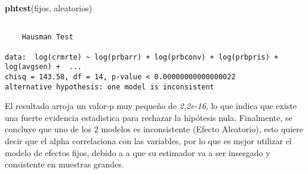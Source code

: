 \documentclass[
  12pt,
]{article}
\newenvironment{Shaded}{\begin{snugshade}}{\end{snugshade}}
\newcommand{\FunctionTok}[1]{\textcolor[rgb]{0.13,0.29,0.53}{\textbf{#1}}}
\newcommand{\NormalTok}[1]{#1}
\begin{document}
\begin{Shaded}
\begin{Highlighting}[]
\FunctionTok{phtest}\NormalTok{(fijos, aleatorios)}
\end{Highlighting}
\end{Shaded}

\begin{verbatim}

    Hausman Test

data:  log(crmrte) ~ log(prbarr) + log(prbconv) + log(prbpris) + log(avgsen) +  ...
chisq = 143.58, df = 14, p-value < 0.00000000000000022
alternative hypothesis: one model is inconsistent
\end{verbatim}

El resultado arroja un valor-p muy pequeño de \emph{2,2e-16}, lo que
indica que existe una fuerte evidencia estadistica para rechazar la
hipótesis nula. Finalmente, se concluye que uno de los 2 modelos es
inconsistente (Efecto Aleatorio), esto quiere decir que el alpha
correlaciona con las variables, por lo que es mejor utilizar el modelo
de efectos fijos, debido a a que su estimador va a ser insesgado y
consistente en muestras grandes.
\end{document}
